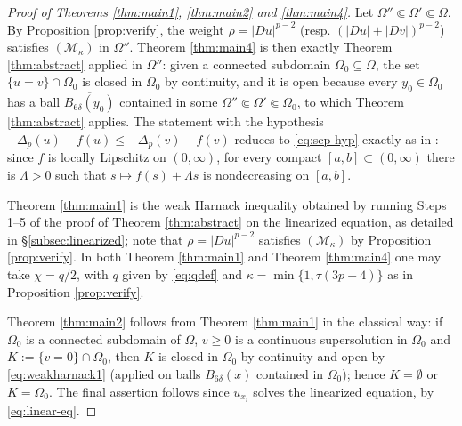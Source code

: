 \documentclass[reqno]{amsart}
\theoremstyle{plain}
\theoremstyle{definition}
\theoremstyle{remark}
\newcommand{\Lap}[1]{\Delta_{#1}}
\begin{document}
\begin{proof}[Proof of Theorems \ref{thm:main1}, \ref{thm:main2} and \ref{thm:main4}]
Let $\Omega''\Subset\Omega'\Subset\Omega$. By Proposition \ref{prop:verify}, the weight
$\rho=|Du|^{p-2}$ (resp. $(|Du|+|Dv|)^{p-2}$) satisfies $(\mathcal M_\kappa)$ in $\Omega''$.
Theorem \ref{thm:main4} is then exactly Theorem \ref{thm:abstract} applied in $\Omega''$: given a
connected subdomain $\Omega_0\subseteq\Omega$, the set $\{u=v\}\cap\Omega_0$ is closed in $\Omega_0$
by continuity, and it is open because every $y_0\in\Omega_0$ has a ball $\overline{B_{6\delta}(y_0)}$
contained in some $\Omega''\Subset\Omega'\Subset\Omega_0$, to which Theorem \ref{thm:abstract}
applies. The statement with the hypothesis
$-\Lap{p}(u)-f(u)\le-\Lap{p}(v)-f(v)$ reduces to \eqref{eq:scp-hyp} exactly as in
\cite[Remark 3.2]{DS2}: since $f$ is locally Lipschitz on $(0,\infty)$, for every compact
$[a,b]\subset(0,\infty)$ there is $\Lambda>0$ such that $s\mapsto f(s)+\Lambda s$ is nondecreasing on
$[a,b]$.

Theorem \ref{thm:main1} is the weak Harnack inequality obtained by running Steps 1--5 of the proof
of Theorem \ref{thm:abstract} on the linearized equation, as detailed in \S\ref{subsec:linearized};
note that $\rho=|Du|^{p-2}$ satisfies $(\mathcal M_\kappa)$ by Proposition \ref{prop:verify}. In
both Theorem \ref{thm:main1} and Theorem \ref{thm:main4} one may take $\chi=q/2$, with $q$ given by
\eqref{eq:qdef} and $\kappa=\min\{1,\tau(3p-4)\}$ as in Proposition \ref{prop:verify}.

Theorem \ref{thm:main2} follows from Theorem \ref{thm:main1} in the classical way: if $\Omega_0$ is
a connected subdomain of $\Omega$, $v\ge0$ is a continuous supersolution in $\Omega_0$ and
$K:=\{v=0\}\cap\Omega_0$, then $K$ is closed in $\Omega_0$ by continuity and open by
\eqref{eq:weakharnack1} (applied on balls $B_{6\delta}(x)$ contained in $\Omega_0$); hence
$K=\emptyset$ or $K=\Omega_0$. The final assertion follows since
$u_{x_i}$ solves the linearized equation, by \eqref{eq:linear-eq}.
\end{proof}
\end{document}
